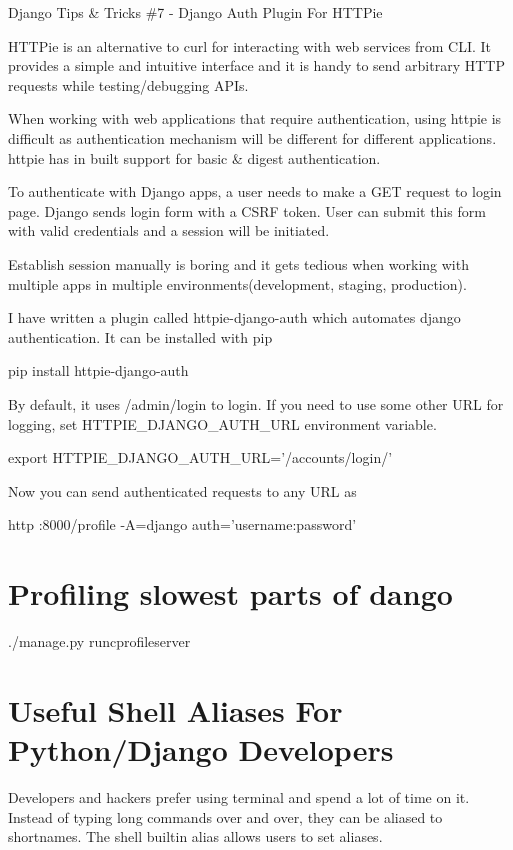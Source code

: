\documentclass[a5paper,10pt,english]{sphinxmanual}
\begin{document}
Django Tips \& Tricks \#7 - Django Auth Plugin For HTTPie

HTTPie is an alternative to curl for interacting with web services from CLI. It provides a simple and intuitive interface and it is handy to send arbitrary HTTP requests while testing/debugging APIs.

When working with web applications that require authentication, using httpie is difficult as authentication mechanism will be different for different applications. httpie has in built support for basic \& digest authentication.

To authenticate with Django apps, a user needs to make a GET request to login page. Django sends login form with a CSRF token. User can submit this form with valid credentials and a session will be initiated.

Establish session manually is boring and it gets tedious when working with multiple apps in multiple environments(development, staging, production).

I have written a plugin called httpie-django-auth which automates django authentication. It can be installed with pip

pip install httpie-django-auth

By default, it uses /admin/login to login. If you need to use some other URL for logging, set HTTPIE\_DJANGO\_AUTH\_URL environment variable.

export HTTPIE\_DJANGO\_AUTH\_URL=’/accounts/login/’

Now you can send authenticated requests to any URL as

http :8000/profile -A=django \textendash{}auth=’username:password’


\chapter{Profiling slowest parts of dango}
\label{\detokenize{misc_profiling:profiling-slowest-parts-of-dango}}\label{\detokenize{misc_profiling::doc}}
./manage.py runcprofileserver


\chapter{Useful Shell Aliases For Python/Django Developers}
\label{\detokenize{misc_shell_aliases:useful-shell-aliases-for-python-django-developers}}\label{\detokenize{misc_shell_aliases::doc}}
Developers and hackers prefer using terminal and spend a lot of time on it. Instead of typing long commands over and over, they can be aliased to shortnames. The shell builtin alias allows users to set aliases.
\end{document}
